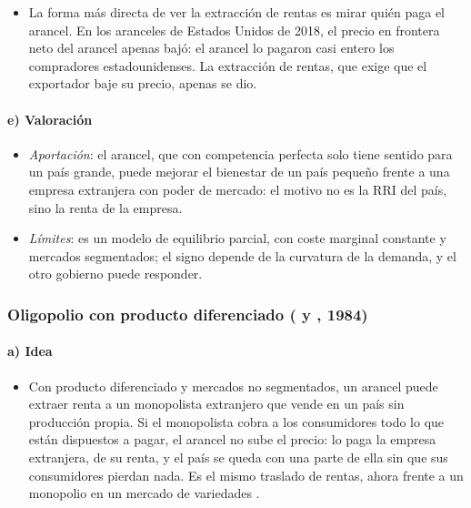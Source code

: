 \documentclass[11pt]{article}
\begin{document}
\begin{itemize}
\item La forma más directa de ver la extracción de rentas es mirar quién paga el arancel. En los aranceles de Estados Unidos de 2018, el precio en frontera neto del arancel apenas bajó: el arancel lo pagaron casi entero los compradores estadounidenses\nocite{Amiti2019Aranceles,Fajgelbaum2020Proteccionismo}. La extracción de rentas, que exige que el exportador baje su precio, apenas se dio.
\end{itemize}

\paragraph{e) Valoración}

\begin{itemize}
\item \emph{Aportación}: el arancel, que con competencia perfecta solo tiene sentido para un país grande, puede mejorar el bienestar de un país pequeño frente a una empresa extranjera con poder de mercado: el motivo no es la RRI del país, sino la renta de la empresa.
\item \emph{Límites}: es un modelo de equilibrio parcial, con coste marginal constante y mercados segmentados; el signo depende de la curvatura de la demanda, y el otro gobierno puede responder.
\end{itemize}

\subsubsection{Oligopolio con producto diferenciado ( y , 1984)}\label{sec:eaton-kierzkowski}

\paragraph{a) Idea}

\begin{itemize}
\item Con producto diferenciado y mercados no segmentados, un arancel puede extraer renta a un monopolista extranjero que vende en un país sin producción propia. Si el monopolista cobra a los consumidores todo lo que están dispuestos a pagar, el arancel no sube el precio: lo paga la empresa extranjera, de su renta, y el país se queda con una parte de ella sin que sus consumidores pierdan nada. Es el mismo traslado de rentas, ahora frente a un monopolio  en un mercado de variedades\nocite{EatonKierzkowski1984Oligopolistic} .
\end{itemize}
\end{document}
